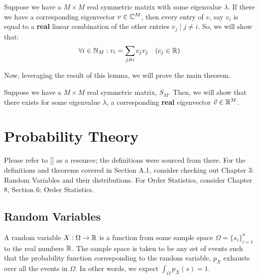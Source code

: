  Suppose we have a $M \times M$ real symmetric matrix with some eigenvalue $\lambda$. If there we have a corresponding eigenvector $v \in \mathbb{C}^M$, then every entry of $v$, say $v_i$ is equal to a \textbf{real} linear combination of the other entries $v_j \mid j \neq i$. So, we will show that:
$$\forall i \in \mathbb{N}_{M}: v_i =  {\sum_{j \neq i} c_j v_j} \quad (c_j \in \mathbb{R})$$

\lemmaproof \newline

\noindent Now, leveraging the result of this lemma, we will prove the main theorem.

\begin{theorem}[Taqi] Suppose we have a $M \times M$ real symmetric matrix, $S_M$. Then, we will show that there exists for some eigenvalue $\lambda$, a corresponding \textbf{real} eigenvector $\vec{v} \in \mathbb{R}^M$.
\end{theorem}

\taqiproof

\newpage
\section{Probability Theory}

Please refer to [\cite{blitz}] as a resource; the definitions were sourced from there. For the definitions and theorems covered in Section A.1, consider checking out Chapter 3: Random Variables and their distributions. For Order Statistics, consider Chapter 8, Section 6: Order Statistics.

\subsection{Random Variables}

\begin{definition}
A random variable $X: \Omega \to \mathbb{R}$ is a function from some sample space $\Omega = \{s_i\}_{i=1}^n$ to the real numbers $\mathbb{R}$. The sample space is taken to be any set of events such that the probability function corresponding to the random variable, $p_X$ exhausts over all the events in $\Omega$. In other words, we expect $\int_\Omega p_X(s) = 1$.
\end{definition}


